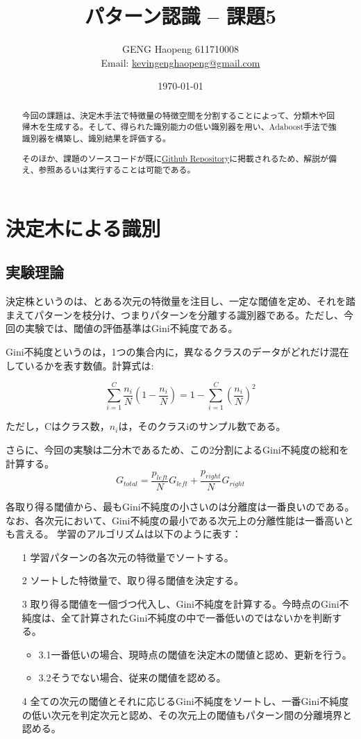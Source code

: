 \documentclass[ %
  uplatex,%
  papersize%
]{jsarticle}
\title{パターン認識 -- 課題5}
\author{\large GENG Haopeng 611710008 \\ \small Email:  \href{mailto:kevingenghaopeng@gmail.com}{kevingenghaopeng@gmail.com}}
\affil{\small Department of Intelligent Systems, Nagoya University}
\date{\today}
\begin{document}
\maketitle

\begin{abstract}
今回の課題は、決定木手法で特徴量の特徴空間を分割することによって、分類木や回帰木を生成する。そして、得られた識別能力の低い識別器を用い、Adaboost手法で強識別器を構築し、識別結果を評価する。

そのほか、課題のソースコードが既に\href{https://github.com/Secondtonumb/pattern_recogn/tree/master/pattern05}{Github Repository}に掲載されるため、解説が備え、参照あるいは実行することは可能である。
\end{abstract}

\section{決定木による識別}
\subsection{実験理論}
決定株というのは、とある次元の特徴量を注目し、一定な閾値を定め、それを踏まえてパターンを枝分け、つまりパターンを分離する識別器である。ただし、今回の実験では、閾値の評価基準はGini不純度である。

Gini不純度というのは，1つの集合内に，異なるクラスのデータがどれだけ混在しているかを表す数値。計算式は:

$$\sum_{i=1}^{C}\frac{n_{i}}{N}(1-\frac{n_{i}}{N})=1 - \sum_{i=1}^{C}(\frac{n_{i}}{N})^2$$

ただし，Cはクラス数，$n_{i}$は，そのクラスiのサンプル数である。

さらに、今回の実験は二分木であるため、この2分割によるGini不純度の総和を計算する。
$$G_{total}= \frac{p_{left}}{N}G_{left}+ \frac{p_{right}}{N}G_{right}  $$

各取り得る閾値から、最もGini不純度の小さいのは分離度は一番良いのである。なお、各次元において、Gini不純度の最小である次元上の分離性能は一番高いとも言える。
学習のアルゴリズムは以下のように表す：
\begin{itemize}
\footnotesize
\item[1] 学習パターンの各次元の特徴量でソートする。
\item[2] ソートした特徴量で、取り得る閾値を決定する。
\item[3] 取り得る閾値を一個づつ代入し、Gini不純度を計算する。今時点のGini不純度は、全て計算されたGini不純度の中で一番低いのではないかを判断する。
\begin{itemize}
\footnotesize
\item3.1一番低いの場合、現時点の閾値を決定木の閾値と認め、更新を行う。
\item3.2そうでない場合、従来の閾値を認める。
\end{itemize}
\item[4] 全ての次元の閾値とそれに応じるGini不純度をソートし、一番Gini不純度の低い次元を判定次元と認め、その次元上の閾値もパターン間の分離境界と認める。
\end{itemize}
\end{document}
